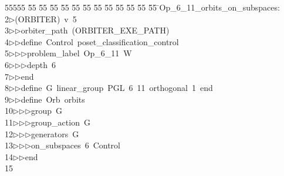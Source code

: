 %
%
\begin{tabbing}
55555 \= 55 \= 55 \= 55 \= 55 \= 55 \= 55 \= 55 \= 55 \= 55 \= 55 \= 55 \= 55 \= \>Op\_6\_11\_orbits\_on\_subspaces:\\[0pt]
2\>$\triangleright$\>(ORBITER)\ v\ 5\ \\[0pt]
3\>$\triangleright$\>$\triangleright$\>orbiter\_path\ (ORBITER\_EXE\_PATH)\ \\[0pt]
4\>$\triangleright$\>$\triangleright$\>define\ Control\ poset\_classification\_control\ \\[0pt]
5\>$\triangleright$\>$\triangleright$\>$\triangleright$\>problem\_label\ Op\_6\_11\ W\ \\[0pt]
6\>$\triangleright$\>$\triangleright$\>$\triangleright$\>depth\ 6\ \\[0pt]
7\>$\triangleright$\>$\triangleright$\>end\ \\[0pt]
8\>$\triangleright$\>$\triangleright$\>define\ G\ linear\_group\ PGL\ 6\ 11\ orthogonal\ 1\ end\ \\[0pt]
9\>$\triangleright$\>$\triangleright$\>define\ Orb\ orbits\ \\[0pt]
10\>$\triangleright$\>$\triangleright$\>$\triangleright$\>group\ G\ \\[0pt]
11\>$\triangleright$\>$\triangleright$\>$\triangleright$\>group\_action\ G\ \\[0pt]
12\>$\triangleright$\>$\triangleright$\>$\triangleright$\>generators\ G\ \\[0pt]
13\>$\triangleright$\>$\triangleright$\>$\triangleright$\>on\_subspaces\ 6\ Control\ \\[0pt]
14\>$\triangleright$\>$\triangleright$\>end\\[0pt]
15\>\end{tabbing}
